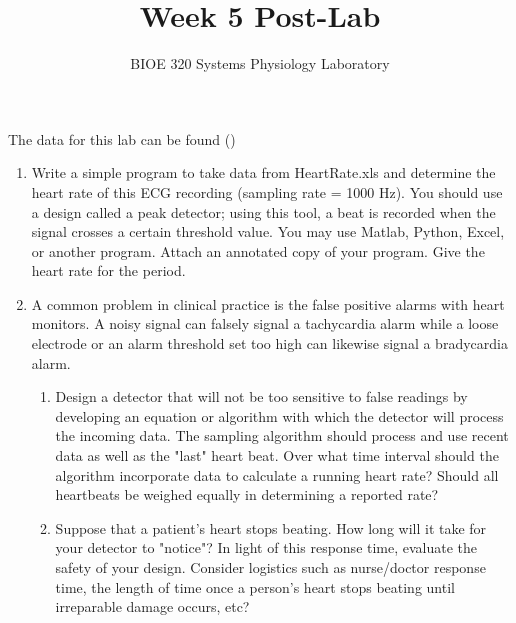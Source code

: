 \documentclass{article}
\title{Week 5 Post-Lab}
\author{BIOE 320 Systems Physiology Laboratory}
\date{}
\begin{document}
\maketitle
\large

\begin{info}
	The data for this lab can be found ()
\end{info}

\begin{enumerate}
	\item Write a simple program to take data from HeartRate.xls and determine the heart rate of this ECG recording (sampling rate = 1000 Hz). You should use a design called a peak detector; using this tool, a beat is recorded when the signal crosses a certain threshold value. You may use Matlab, Python, Excel, or another program. Attach an annotated copy of your program. Give the heart rate for the period.
	\item A common problem in clinical practice is the false positive alarms with heart monitors. A noisy signal can falsely signal a tachycardia alarm while a loose electrode or an alarm threshold set too high can likewise signal a bradycardia alarm.
	\begin{enumerate}
		\item Design a detector that will not be too sensitive to false readings by developing an equation or algorithm with which the detector will process the incoming data. The sampling algorithm should process and use recent data as well as the "last" heart beat. Over what time interval should the algorithm incorporate data to calculate a running heart rate? Should all heartbeats be weighed equally in determining a reported rate?
		\item Suppose that a patient's heart stops beating. How long will it take for your detector to "notice"? In light of this response time, evaluate the safety of your design. Consider logistics such as nurse/doctor response time, the length of time once a person's heart stops beating until irreparable damage occurs, etc?
	\end{enumerate}
\end{enumerate}
\end{document}
